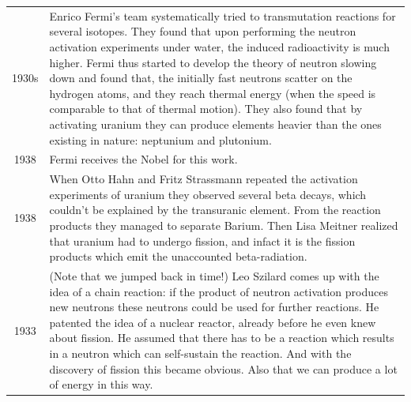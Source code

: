 \begin{tabularx}{\textwidth}{c | X}
1930s & Enrico Fermi's team systematically tried to transmutation reactions for several isotopes. They found that upon performing the neutron activation experiments under water, the induced radioactivity is much higher. Fermi thus started to develop the theory of neutron slowing down and found that, the initially fast neutrons scatter on the hydrogen atoms, and they reach thermal energy (when the speed is comparable to that of thermal motion). They also found that by activating uranium they can produce elements heavier than the ones existing in nature: neptunium and plutonium. \\
1938 & Fermi receives the Nobel for this work. \\
1938 & When Otto Hahn and Fritz Strassmann repeated the activation experiments of uranium they observed several beta decays, which couldn't be explained by the transuranic element. From the reaction products they managed to separate Barium. Then Lisa Meitner realized that uranium had to undergo fission, and infact it is the fission products which emit the unaccounted beta-radiation. \\
1933 & (Note that we jumped back in time!) Leo Szilard comes up with the idea of a chain reaction: if the product of neutron activation produces new neutrons these neutrons could be used for further reactions. He patented the idea of a nuclear reactor, already before he even knew about fission. He assumed that there has to be a reaction which results in a neutron which can self-sustain the reaction. And with the discovery of fission this became obvious. Also that we can produce a lot of energy in this way. 
\end{tabularx}

